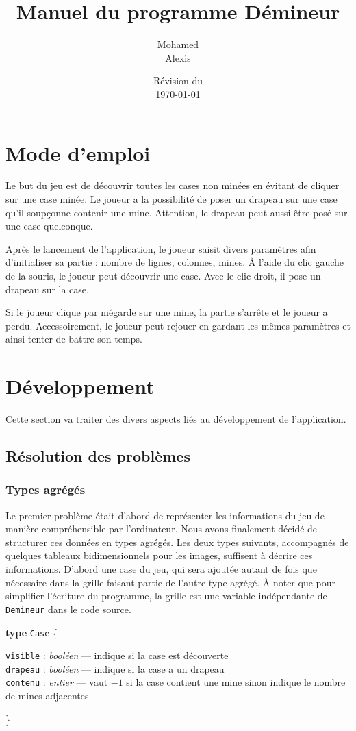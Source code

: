 \documentclass[a4paper, 12pt, oneside]{article}
\title{Manuel du programme Démineur}
\author{Mohamed \bsc{Lakhal}\\Alexis \bsc{Cabodi}}
\date{Révision du\\\today}
\newenvironment{typeag}[1][]{\noindent \textbf{type} \texttt{#1} \{\begin{addmargin}[2em]{0em}}{\end{addmargin}\}}
\newcommand{\variable}[3]{\noindent \texttt{#1} : \textit{#2} --- #3}
\newcommand{\var}[1]{\texttt{#1}}
\begin{document}
\maketitle
\newpage
\tableofcontents
\newpage

\section{Mode d'emploi}
Le but du jeu est de découvrir toutes les cases non minées en évitant de cliquer sur une case minée. Le joueur a la possibilité de poser un drapeau sur une case qu'il soupçonne contenir une mine. Attention, le drapeau peut aussi être posé sur une case quelconque.
\bigskip

Après le lancement de l'application, le joueur saisit divers paramètres afin d'initialiser sa partie : nombre de lignes, colonnes, mines.
À l'aide du clic gauche de la souris, le joueur peut découvrir une case. Avec le clic droit, il pose un drapeau sur la case.
\bigskip

Si le joueur clique par mégarde sur une mine, la partie s'arrête et le joueur a perdu.
Accessoirement, le joueur peut rejouer en gardant les mêmes paramètres et ainsi tenter de battre son temps.
\newpage
\section{Développement}
Cette section va traiter des divers aspects liés au développement de l'application.
\subsection{Résolution des problèmes}

\subsubsection{Types agrégés}
Le premier problème était d'abord de représenter les informations du jeu de manière compréhensible par l'ordinateur. Nous avons finalement décidé de structurer ces données en types agrégés. Les deux types suivants, accompagnés de quelques tableaux bidimensionnels pour les images, suffisent à décrire ces informations. D'abord une case du jeu, qui sera ajoutée autant de fois que nécessaire dans la grille faisant partie de l'autre type agrégé. À noter que pour simplifier l'écriture du programme, la grille est une variable indépendante de \var{Demineur} dans le code source.

\smallskip
\begin{typeag}[Case]
	\variable{visible}{booléen}{indique si la case est découverte} \\
	\variable{drapeau}{booléen}{indique si la case a un drapeau} \\
	\variable{contenu}{entier}{vaut $-1$ si la case contient une mine sinon indique le nombre de mines adjacentes}
\end{typeag}
\end{document}
